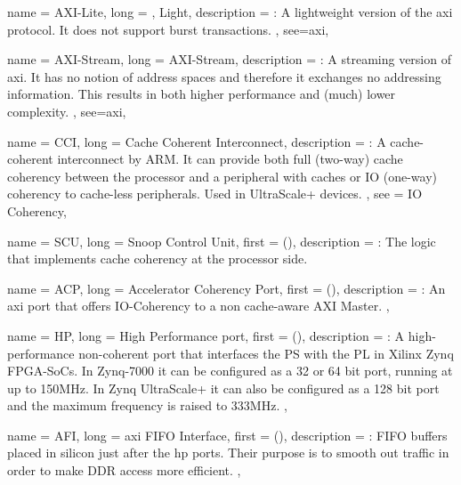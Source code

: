 {
	name = {AXI-Lite},
	long = {, Light},
	description = {\emph{}:
		A lightweight version of the \gls{axi} protocol. 
		It does not support \gls{burst} transactions.
	},
	see={axi},
}

{
	name = {AXI-Stream},
	long = {AXI-Stream},
	description = {\emph{}:
		A streaming version of \gls{axi}. It has no notion of address spaces
		and therefore it exchanges no addressing information. 
		This results in both higher performance and (much) lower complexity.
	},
	see={axi},
}



{
	name = {CCI},
	long = {Cache Coherent Interconnect},
	description = {\emph{}:
		A cache-coherent interconnect by ARM. 
		It can provide both full (two-way) cache coherency between the processor and
		a peripheral with caches or IO (one-way) coherency to cache-less
		peripherals. Used in UltraScale+ devices.
	},
	see = {IO Coherency},
}


{
	name = {SCU},
	long = {Snoop Control Unit},
	first = { ()},
	description = {\emph{}:
		The logic that implements cache coherency at the processor side.
	}
}

{
	name = {ACP},
	long = {Accelerator Coherency Port},
	first = { ()},
	description = {\emph{}:
		An \gls{axi} port that offers IO-Coherency to a non cache-aware AXI Master.
	},
}


{
	name = {HP},
	long = {High Performance port},
	first = { ()},
	description = {\emph{}:
		A high-performance non-coherent port that interfaces 
		the PS with the PL in Xilinx Zynq FPGA-SoCs.
		In Zynq-7000 it can be configured as a 32 or 64 bit port, running at up to 150MHz.
		In Zynq UltraScale+ it can also be configured as a 128 bit port and the maximum
		frequency is raised to 333MHz.
	},
}

{
	name = {AFI},
	long = {\gls{axi} FIFO Interface},
	first = { ()},
	description = {\emph{}:
		FIFO buffers placed in silicon just after the \gls{hp} ports. 
		Their purpose is to smooth out traffic in order to make DDR access more efficient.
	},
}


